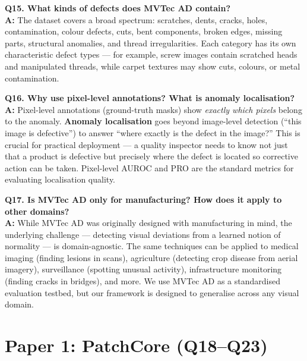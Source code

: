 \documentclass[12pt, a4paper]{article}
\begin{document}
\begin{qa}
\textbf{Q15. What kinds of defects does MVTec AD contain?}\\[4pt]
\textbf{A:} The dataset covers a broad spectrum: scratches, dents, cracks, holes, contamination, colour defects, cuts, bent components, broken edges, missing parts, structural anomalies, and thread irregularities. Each category has its own characteristic defect types --- for example, screw images contain scratched heads and manipulated threads, while carpet textures may show cuts, colours, or metal contamination.
\end{qa}

\begin{qa}
\textbf{Q16. Why use pixel-level annotations? What is anomaly localisation?}\\[4pt]
\textbf{A:} Pixel-level annotations (ground-truth masks) show \textit{exactly which pixels} belong to the anomaly. \textbf{Anomaly localisation} goes beyond image-level detection (``this image is defective'') to answer ``where exactly is the defect in the image?'' This is crucial for practical deployment --- a quality inspector needs to know not just that a product is defective but precisely where the defect is located so corrective action can be taken. Pixel-level AUROC and PRO are the standard metrics for evaluating localisation quality.
\end{qa}

\begin{qa}
\textbf{Q17. Is MVTec AD only for manufacturing? How does it apply to other domains?}\\[4pt]
\textbf{A:} While MVTec AD was originally designed with manufacturing in mind, the underlying challenge --- detecting visual deviations from a learned notion of normality --- is domain-agnostic. The same techniques can be applied to medical imaging (finding lesions in scans), agriculture (detecting crop disease from aerial imagery), surveillance (spotting unusual activity), infrastructure monitoring (finding cracks in bridges), and more. We use MVTec AD as a standardised evaluation testbed, but our framework is designed to generalise across any visual domain.
\end{qa}

\section{Paper 1: PatchCore (Q18--Q23)}
\end{document}
